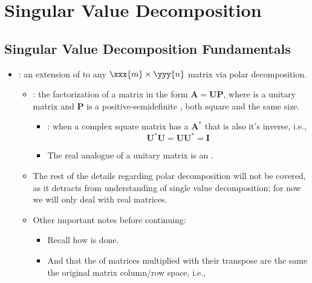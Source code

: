 \chapter{Singular Value Decomposition}\label{Singular Value Decomposition}

\section{Singular Value Decomposition Fundamentals}\label{Singular Value Decomposition Fundamentals}
\begin{itemize}
  \item {}: an extension of \hyperref[Eigendecomposition]{} to any \(\xxx{m} \times \yyy{n} \) matrix via polar decomposition.
    \begin{itemize}
      \item {}: the factorization of a matrix  in the form \(\bm{A}=\bm{U}{\bm
      {P}}\), where  is a unitary matrix and \(\bm{{P}}\) is a positive-semidefinite \hyperref[Diagonal and Trace]{}, both square and the same size.
        \begin{itemize}
          \item {}: when a complex square matrix has a \hyperref[Conjugate Transpose]{} \(\bm{A}^* \) that is also it's inverse, i.e.,
          \[%
          \bm{U}^*\bm{U} = \bm{U}\bm{U}^* = \bm{I}
          \]%
          \item The real analogue of a unitary matrix is an \hyperref[Orthogonal Matrices]{}.
        \end{itemize}
      \item The rest of the details regarding polar decomposition will not be covered, as it detracts from understanding of single value decomposition; for now we will only deal with real matrices.
      \item Other important notes before continuing:
      \begin{itemize}
        \item Recall how \hyperref[Hadamard Multiplication]{} is done.
        \item And that the \hyperref[Column Space]{} of matrices multiplied with their transpose are the same the original matrix column/row space, i.e., 

\end{itemize}
\end{itemize}
\end{itemize}
